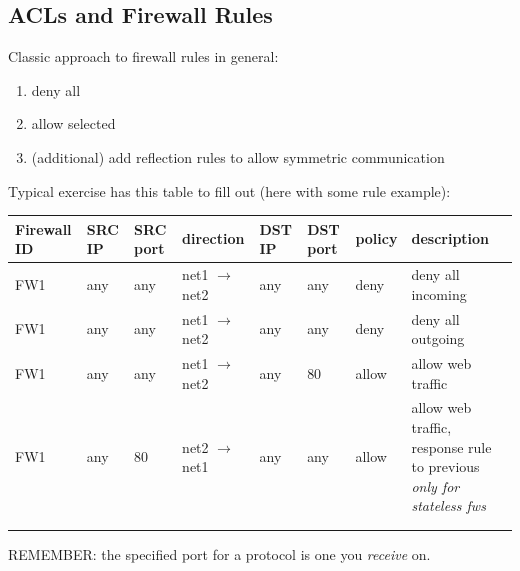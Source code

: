 \documentclass{article}
\begin{document}
			\subsection{ACLs and Firewall Rules}
				Classic approach to firewall rules in general:
				\begin{enumerate}
					\item deny all
					\item allow selected
					\item (additional) add reflection rules to allow symmetric communication
				\end{enumerate}
				Typical exercise has this table to fill out (here with some rule example):
				\begin{center}
					\begin{tabular}{ | m{3em} | m{2em} | m{2em} | m{4em} | m{2em} | m{2em} | m{5em} | m{5em} |}
						\hline
						Firewall ID & SRC IP & SRC port & direction & DST IP & DST port & policy & description\\
						\hline
						\hline
						FW1 & any & any & net1 $\rightarrow$ net2 & any & any & deny & deny all incoming\\
						\hline
						FW1 & any & any & net1 $\rightarrow$ net2 & any & any & deny & deny all outgoing\\
						\hline
						FW1 & any & any & net1 $\rightarrow$ net2 & any & 80 & allow & allow web traffic\\
						\hline
						FW1 & any & 80 & net2 $\rightarrow$ net1 & any & any & allow & allow web traffic, response rule to previous \emph{only for stateless fws}\\
						\hline
						&&&&&&&\\
						\hline
						&&&&&&&\\
						\hline
					\end{tabular}
				\end{center}
				REMEMBER: the specified port for a protocol is one you \emph{receive} on.
				
\end{document}
